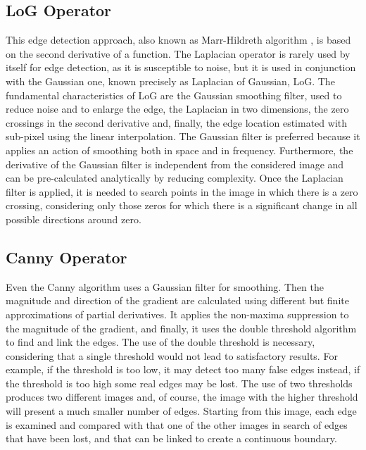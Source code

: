 \documentclass[final,a4paper,12pt,english]{UnicaPhdThesis3}
\begin{document}
\subsection{LoG Operator} %
This edge detection approach, also known as Marr-Hildreth algorithm \cite{Marr}, is based on the second derivative of a function. The Laplacian operator is rarely used by itself for edge detection, as it is susceptible to noise, but it is used in conjunction with the Gaussian one, known precisely as Laplacian of Gaussian, LoG. The fundamental characteristics of LoG are the Gaussian smoothing filter, used to reduce noise and to enlarge the edge, the Laplacian in two dimensions, the zero crossings in the second derivative and, finally, the edge location estimated with sub-pixel using the linear interpolation. The Gaussian filter is preferred because it applies an action of smoothing both in space and in frequency. Furthermore, the derivative of the Gaussian filter is independent from the considered image and can be pre-calculated analytically by reducing complexity. Once the Laplacian filter is applied, it is needed to search points in the image in which there is a zero crossing, considering only those zeros for which there is a significant change in all possible directions around zero.

\subsection{Canny Operator}
Even the Canny algorithm \cite{Canny} uses a Gaussian filter for smoothing. Then the magnitude and direction of the gradient are calculated using different but finite approximations of partial derivatives. It applies the non-maxima suppression to the magnitude of the gradient, and finally, it uses the double threshold algorithm to find and link the edges. The use of the double threshold is necessary, considering that a single threshold would not lead to satisfactory results. For example, if the threshold is too low, it may detect too many false edges instead, if the threshold is too high some real edges may be lost. The use of two thresholds produces two different images and, of course, the image with the higher threshold will present a much smaller number of edges. Starting from this image, each edge is examined and compared with that one of the other images in search of edges that have been lost, and that can be linked to create a continuous boundary.
\end{document}
